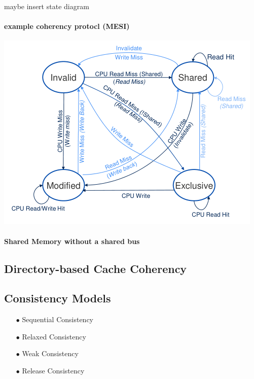 \documentclass[8pt]{extarticle}
\begin{document}
\begin{multicols*}{4}
maybe insert state diagram

\paragraph{example coherency protocl (MESI)}

\begin{center}
  \includegraphics[width=0.8\linewidth]{img/MESIStates.png}
  \label{fig:mesistates}
\end{center}

\paragraph{Shared Memory without a shared bus}

\subsection{Directory-based Cache Coherency}

\subsection{Consistency Models}

\begin{enumerate}
  \item[$\bullet$] Sequential Consistency
  \item[$\bullet$] Relaxed Consistency
  \item[$\bullet$] Weak Consistency 
  \item[$\bullet$] Release Consistency
\end{enumerate}




\end{multicols*}
\end{document}
